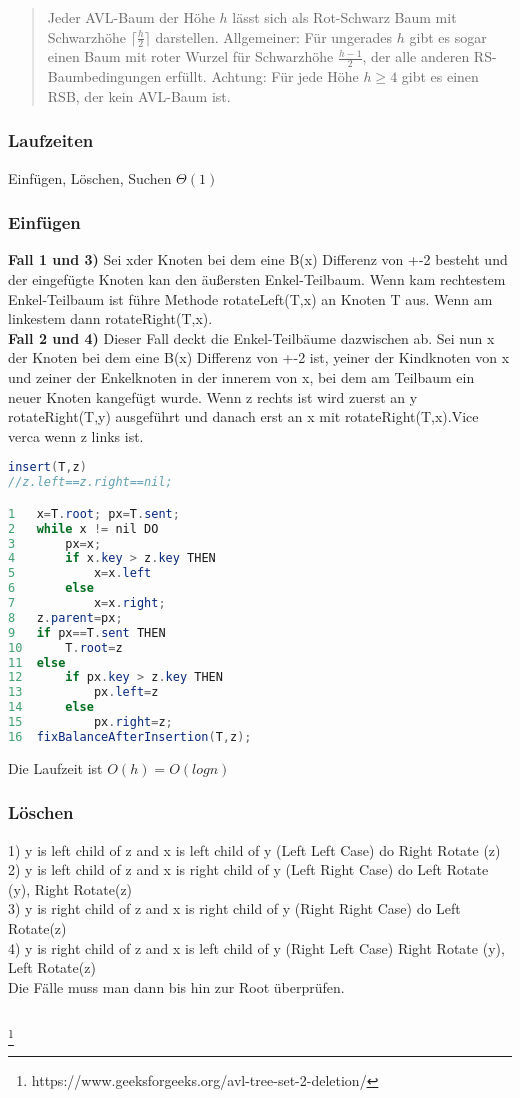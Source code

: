\documentclass[jou,apacite]{apa6}
\begin{document}
\begin{quote}
    Jeder AVL-Baum der Höhe $h$ lässt sich als Rot-Schwarz Baum mit Schwarzhöhe ${\lceil{\frac{h}{2}}}\rceil$ darstellen. Allgemeiner: Für ungerades $h$ gibt es sogar einen Baum mit roter Wurzel für Schwarzhöhe $\frac{h-1}{2}$, der alle anderen RS-Baumbedingungen erfüllt. Achtung: Für jede Höhe $h \geq 4$ gibt es einen RSB, der kein AVL-Baum ist.
\end{quote}
\subsubsection{Laufzeiten}
Einfügen, Löschen, Suchen  $\Theta(1)$
\subsubsection{Einfügen}
{\bfseries Fall 1 und 3)} 
Sei \dq x\dq der Knoten bei dem eine B(x) Differenz von +-2 besteht und der eingefügte Knoten \dq k\dq an den äußersten Enkel-Teilbaum. Wenn \dq k\dq am rechtestem Enkel-Teilbaum ist führe Methode rotateLeft(T,x) an Knoten T aus. Wenn am linkestem dann rotateRight(T,x). \\
{\bfseries Fall 2 und 4)} 
Dieser Fall deckt die Enkel-Teilbäume dazwischen ab. Sei nun x der Knoten bei dem eine B(x) Differenz von +-2 ist, \dq y\dq einer der Kindknoten von x und \dq z\dq einer der Enkelknoten in der innerem von x, bei dem am Teilbaum ein neuer Knoten \dq k\dq angefügt wurde. Wenn z rechts ist wird zuerst an y rotateRight(T,y) ausgeführt und danach erst an x mit rotateRight(T,x).Vice verca wenn z links ist.
\begin{lstlisting}[language=java]
insert(T,z)
//z.left==z.right==nil;

1   x=T.root; px=T.sent;
2   while x != nil DO
3       px=x;
4       if x.key > z.key THEN
5           x=x.left
6       else
7           x=x.right;
8   z.parent=px;
9   if px==T.sent THEN
10      T.root=z
11  else
12      if px.key > z.key THEN
13          px.left=z
14      else
15          px.right=z;
16  fixBalanceAfterInsertion(T,z);
\end{lstlisting}
Die Laufzeit ist $O(h) = O(log n)$
\subsubsection{Löschen \\}
1) y is left child of z and x is left child of y (Left Left Case) do
Right Rotate (z) \\
2) y is left child of z and x is right child of y (Left Right Case) do
Left Rotate (y), Right Rotate(z) \\
3) y is right child of z and x is right child of y (Right Right Case) do
Left Rotate(z) \\
4) y is right child of z and x is left child of y (Right Left Case)
Right Rotate (y), Left Rotate(z) \\
Die Fälle muss man dann bis hin zur Root überprüfen.
\begin{lstlisting}[language=java]

\end{lstlisting}
\footnote{https://www.geeksforgeeks.org/avl-tree-set-2-deletion/}
\end{document}
